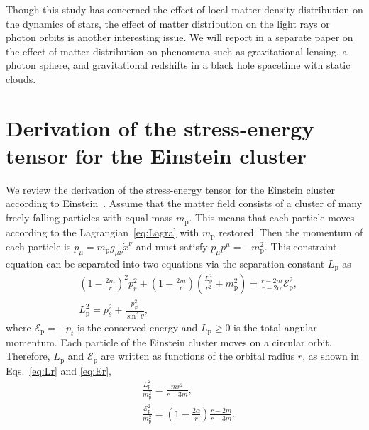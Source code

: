 \documentclass[aps,11pt,nofootinbib,preprintnumbers,groupedaddress,superscriptaddress]{revtex4-2}
\begin{document}
Though this study 
has concerned 
the effect of local matter density distribution on the dynamics of 
stars,
the effect of matter distribution on the light rays or photon orbits is another interesting issue. We will report in a separate paper on the effect of matter distribution on phenomena such as gravitational lensing, a photon sphere, and gravitational redshifts in a black hole spacetime with static clouds. 


\appendix


\section{Derivation of the stress-energy tensor for the Einstein cluster}
\label{sec:A}
We review the derivation of the stress-energy tensor for the Einstein cluster according to Einstein~\cite{Einstein:1939}.
Assume that the matter field consists of a cluster of many freely falling particles with equal mass $m_{\mathrm{p}}$. 
This means that each particle moves according to the Lagrangian~\eqref{eq:Lagra} with $m_{\mathrm{p}}$ restored. 
Then the momentum of each particle is $p_\mu=m_{\mathrm{p}} g_{\mu\nu} \dot{x}^\nu$ and must satisfy $p_\mu p^\mu=-m_{\mathrm{p}}^2$. 
This constraint equation can be separated into two equations via the separation constant 
$L_{\mathrm{p}}$
as 
\begin{align}
&\left(1-\frac{2m}{r}\right)^2 p_r^2+\left(1-\frac{2m}{r}\right)\left(
\frac{L_{\mathrm{p}}^2}{r^2}
+m_{\mathrm{p}}^2\right)=
\frac{r-2m}{r-2\alpha} \mathcal{E}_{\mathrm{p}}^2,
\\
\label{eq:Q}
&
L_{\mathrm{p}}^2
=p_\theta^2+\frac{p_\varphi^2}{\sin^2\theta},
\end{align}
where $\mathcal{E}_{\mathrm{p}}=-p_t$ is the conserved energy and
$L_{\mathrm{p}}\geq 0$
is the total angular momentum. 
Each particle 
of
the Einstein cluster moves on a circular orbit. 
Therefore, 
$L_{\mathrm{p}}$
and $\mathcal{E}_{\mathrm{p}}$ are written as functions of the orbital radius $r$, as shown in Eqs.~\eqref{eq:Lr} and \eqref{eq:Er},
\begin{align}
&
\frac{L_{\mathrm{p}}^2}{m_{\mathrm{p}}^2}
=\frac{m r^2}{r-3m},
\\
&\frac{\mathcal{E}_{\mathrm{p}}^2}{m_{\mathrm{p}}^2}=\left(1-\frac{2\alpha}{r}\right)\frac{r-2m}{r-3m}.
\end{align}
\end{document}
